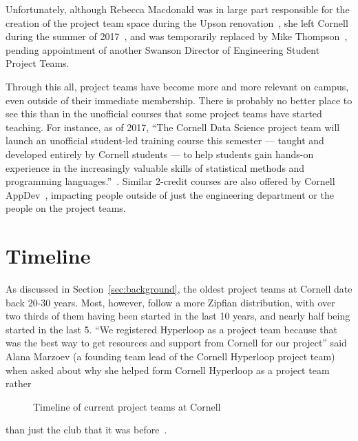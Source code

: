 \documentclass[12pt]{article}
\begin{document}
Unfortunately, although Rebecca Macdonald was in large part responsible for the creation of the project team space during the Upson renovation~\cite{noauthor_q&rebecca_2014}, she left Cornell during the summer of 2017~\cite{macdonald_thank_2017}, and was temporarily replaced by Mike Thompson~\cite{ivory_thank_2017}, pending appointment of another Swanson Director of Engineering Student Project Teams.

Through this all, project teams have become more and more relevant on campus, even outside of their immediate membership.
There is probably no better place to see this than in the unofficial courses that some project teams have started teaching.
For instance, as of 2017, ``The Cornell Data Science project team will launch an unofficial student-led training course this semester — taught and developed entirely by Cornell students — to help students gain hands-on experience in the increasingly valuable skills of statistical methods and programming languages.''~\cite{si_cornell_2017}.
Similar 2-credit courses are also offered by Cornell AppDev~\cite{noauthor_cornell_2018-5}, impacting people outside of just the engineering department or the people on the project teams.

\section{Timeline}
\label{sec:timeline}

As discussed in Section~\ref{sec:background}, the oldest project teams at Cornell date back 20-30 years.
Most, however, follow a more Zipfian distribution, with over two thirds of them having been started in the last 10 years, and nearly half being started in the last 5.
``We registered Hyperloop as a project team because that was the best way to get resources and support from Cornell for our project'' said Alana Marzoev (a founding team lead of the Cornell Hyperloop project team) when asked about why she helped form Cornell Hyperloop as a project team rather

\begin{landscape}
  \begin{figure}
    
    \caption{Timeline of current project teams at Cornell}
    \label{fig:timeline}
  \end{figure}
\end{landscape}

\noindent than just the club that it was before~\cite{marzoev_rationale_2018}.
\end{document}
